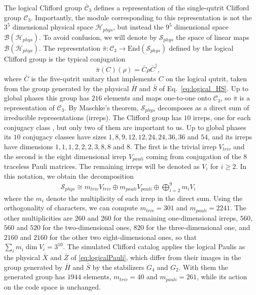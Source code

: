 The logical Clifford group $\bar{\mathcal{C}}_3$ defines a representation of the single-qutrit Clifford group $\mathcal{C}_3$.
Importantly, the module corresponding to this representation is not the $3^5$ dimensional physical space $\mathcal{H}_{phys}$, but instead the $9^5$ dimensional space $\mathcal{B}({\mathcal{H}_{phys}})$.
To avoid confusion, we will denote by $\mathcal{S}_{phys}$ the space of linear maps $\mathcal{B}(\mathcal{H}_{phys})$.
The representation $\bar{\pi} : \mathcal{C}_3 \to 
\mathrm{End}(\mathcal{S}_{phys})$ defined by the logical Clifford group is the typical conjugation
$$
\bar{\pi}(C)(\rho) = \bar{C} \rho \bar{C}^\dagger,
$$
where $\bar{C}$ is the five-qutrit unitary that implements $C$ on the logical qutrit, taken from the group generated by the physical $\bar H$ and $\bar S$ of Eq.~\eqref{eq:logical_HS}. Up to global phases this group has $216$ elements and maps one-to-one onto $\mathcal{C}_3$, so $\bar{\pi}$ is a representation of $\mathcal{C}_3$.
By Maschke's theorem, $\mathcal{S}_{phys}$ decomposes as a direct sum of irreducible representations (irreps).
The Clifford group has $10$ irreps, one for each conjugacy class , but only two of them are important to us. Up to global phases its $10$ conjugacy classes have sizes $1, 8, 9, 12, 12, 24, 24, 36, 36$ and $54$, and its irreps have dimensions $1, 1, 1, 2, 2, 2, 3, 8, 8$ and $8$.
The first is the trivial irrep $V_{triv}$ and the second is the eight dimensional irrep $V_{pauli}$ coming from conjugation of the $8$ traceless Pauli matrices.
The remaining irreps will be denoted as $V_i$ for $i \geq 2$. In this notation, we obtain the decomposition
\begin{align}
    \mathcal{S}_{phys} \cong m_{triv} V_{triv} \oplus m_{pauli} V_{pauli} \oplus \bigoplus_{i = 2}^{9} m_i V_i
\end{align}
where the $m_i$ denote the multiplicity of each irrep in the direct sum.
Using the orthogonality of characters, we can compute $m_{triv} = 301$ and $m_{pauli} = 2241$. The other multiplicities are $260$ and $260$ for the remaining one-dimensional irreps, $560$, $560$ and $520$ for the two-dimensional ones, $820$ for the three-dimensional one, and $2160$ and $2160$ for the other two eight-dimensional ones, so that $\sum_i m_i \dim V_i = 3^{10}$. The simulated Clifford catalog applies the logical Paulis as the physical $\bar X$ and $\bar Z$ of \autoref{eq:logicalPauli}, which differ from their images in the group generated by $\bar H$ and $\bar S$ by the stabilizers $G_4$ and $G_2$. With them the generated group has $1944$ elements, $m_{triv} = 40$ and $m_{pauli} = 261$, while its action on the code space is unchanged.
